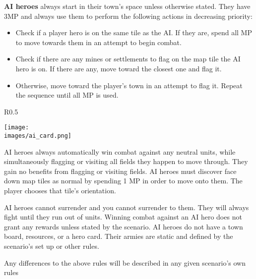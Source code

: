 \documentclass[12pt]{article}
\def\assets{assets}
\def\images{\assets/images}
\begin{document}
\clearpage
\textbf{AI heroes} always start in their town's space unless otherwise stated. They have 3MP and always use them to perform the following actions in decreasing priority:
\begin{itemize}
    \item Check if a player hero is on the same tile as the AI. If they are, spend all MP to move towards them in an attempt to begin combat.
    \item Check if there are any mines or settlements to flag on the map tile the AI hero is on. If there are any, move toward the closest one and flag it.
    \item Otherwise, move toward the player's town in an attempt to flag it. Repeat the sequence until all MP is used.
\end{itemize}
\begin{wrapfigure}{R}{0.5\textwidth}
    \begin{center}
    \texttt{[image: \\images/ai\_card.png]}
    \end{center}
\end{wrapfigure}
AI heroes always automatically win combat against any neutral units, while simultaneously flagging or visiting all fields they happen to move through. They gain no benefits from flagging or visiting fields. AI heroes must discover face down map tiles as normal by spending 1 MP in order to move onto them. The player chooses that tile’s orientation.\par
AI heroes cannot surrender and you cannot surrender to them. They will always fight until they run out of units. Winning combat against an AI hero does not grant any rewards unless stated by the scenario. AI heroes do not have a town board, resources, or a hero card. Their armies are static and defined by the scenario’s set up or other rules.\par

Any differences to the above rules will be described in any given scenario’s own rules
\clearpage
\end{document}
